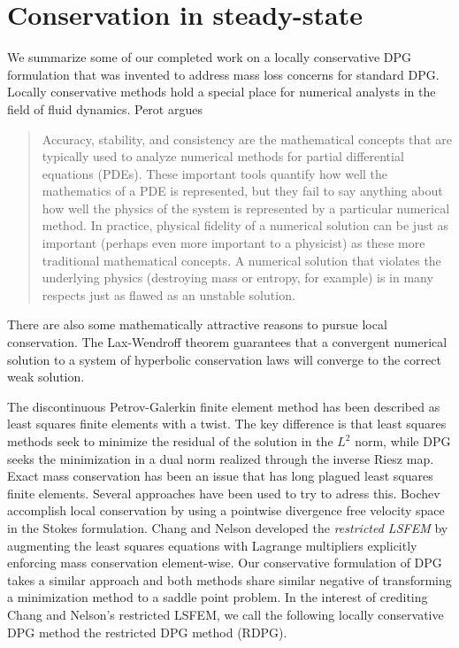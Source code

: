\documentclass[Proposal.tex]{subfiles}
\begin{document}
\chapter{Conservation in steady-state}
\label{sec:conservation}
We summarize some of our completed work on a locally conservative DPG formulation that was invented to address mass loss concerns for standard DPG.
Locally conservative methods hold a special place for numerical analysts in
the field of fluid dynamics.
Perot\cite{Perot2011} argues
\begin{quote}
Accuracy, stability, and consistency are the mathematical concepts that are
typically used to analyze numerical methods for partial differential equations
(PDEs). These important tools quantify how well the mathematics of a PDE is
represented, but they fail to say anything about how well the physics of the
system is represented by a particular numerical method. In practice, physical
fidelity of a numerical solution can be just as important (perhaps even more
important to a physicist) as these more traditional mathematical concepts. A
numerical solution that violates the underlying physics (destroying mass or
entropy, for example) is in many respects just as flawed as an unstable
solution.
\end{quote}
There are also some mathematically attractive reasons to pursue local
conservation. The Lax-Wendroff theorem guarantees that a convergent numerical
solution to a system of hyperbolic conservation laws will converge to the
correct weak solution.

The discontinuous Petrov-Galerkin finite element method has been described as
least squares finite elements with a twist. The key difference is that least
squares methods seek to minimize the residual of the solution in the $L^2$
norm, while DPG seeks the minimization in a dual norm realized through the
inverse Riesz map. Exact mass conservation has been an issue that has long plagued
least squares finite elements. Several approaches have been
used to try to adress this. Bochev \etal\cite{Bochev2010} accomplish local
conservation by using a pointwise divergence free velocity space in the Stokes
formulation.  Chang and Nelson\cite{ChangNelson1997} developed the
\emph{restricted LSFEM}\cite{ChangNelson1997} by augmenting the least squares
equations with Lagrange multipliers explicitly enforcing mass conservation
element-wise. Our conservative formulation of DPG takes a similar approach and
both methods share similar negative of transforming a minimization method to a
saddle point problem. In the interest of crediting Chang and Nelson's
restricted LSFEM, we call the following locally conservative DPG method the
restricted DPG method (RDPG).
\end{document}

